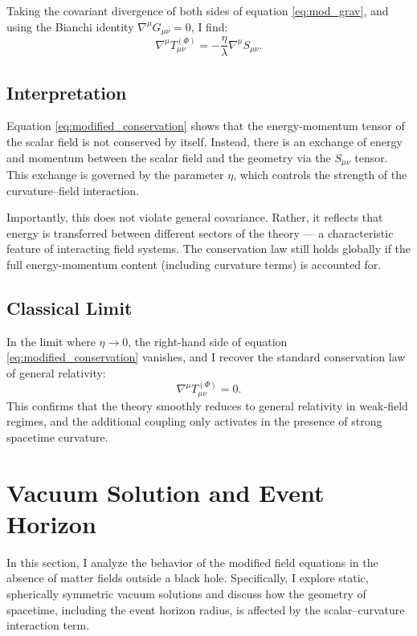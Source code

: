 \documentclass[12pt]{article}
\begin{document}
Taking the covariant divergence of both sides of equation \eqref{eq:mod_grav}, and using the Bianchi identity \( \nabla^\mu G_{\mu\nu} = 0 \), I find:
\begin{equation}
\nabla^\mu T_{\mu\nu}^{(\Phi)} = -\frac{\eta}{\lambda} \nabla^\mu S_{\mu\nu}.
\label{eq:modified_conservation}
\end{equation}

\subsection{Interpretation}

Equation \eqref{eq:modified_conservation} shows that the energy-momentum tensor of the scalar field is not conserved by itself. Instead, there is an exchange of energy and momentum between the scalar field and the geometry via the \( S_{\mu\nu} \) tensor. This exchange is governed by the parameter \( \eta \), which controls the strength of the curvature--field interaction.

Importantly, this does not violate general covariance. Rather, it reflects that energy is transferred between different sectors of the theory — a characteristic feature of interacting field systems. The conservation law still holds globally if the full energy-momentum content (including curvature terms) is accounted for.

\subsection{Classical Limit}

In the limit where \( \eta \to 0 \), the right-hand side of equation \eqref{eq:modified_conservation} vanishes, and I recover the standard conservation law of general relativity:
\[
\nabla^\mu T_{\mu\nu}^{(\Phi)} = 0.
\]
This confirms that the theory smoothly reduces to general relativity in weak-field regimes, and the additional coupling only activates in the presence of strong spacetime curvature.

\section{Vacuum Solution and Event Horizon}

In this section, I analyze the behavior of the modified field equations in the absence of matter fields outside a black hole. Specifically, I explore static, spherically symmetric vacuum solutions and discuss how the geometry of spacetime, including the event horizon radius, is affected by the scalar–curvature interaction term.
\end{document}
